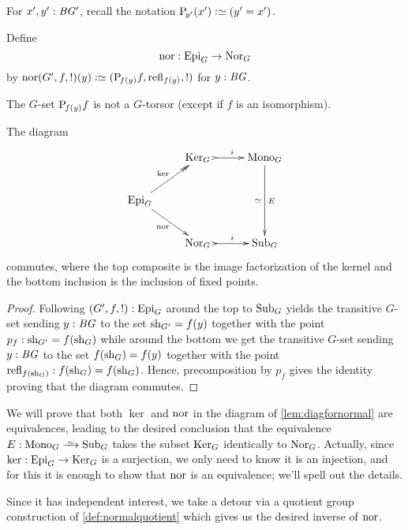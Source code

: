 For $x',y':\mathit{B}\mathit{G}'$, recall the notation $\pathsp{y'}(x')\defequi(y'=x')$.
\begin{definition}
  \label{def:ker2}
  Define $$\nor:\typeepi_G\to\typenormal_G$$
  by $\nor(G',f,!)(y)\defequi(\pathsp{f(y)}f,\refl{f(y)},!)$ for $y:\mathit{B}\mathit{G}$.
\end{definition}
\begin{remark}
  The $G$-set $\mathrm{P}_{\!f(y)}f$ is not a $G$-torsor (except if $f$ is an isomorphism).
\end{remark}

\begin{lemma}
  \label{lem:diagfornormal}
  The diagram
  $$\xymatrix{
  &\typekernel_G\,\,\ar@{>->}[r]^i&\typemono_G\ar[dd]_{\simeq}^{E}\\
  \typeepi_G\ar@{->>}[ur]^{\ker}\ar[dr]_{\nor}&&\\
  &\typenormal_G\,\,\ar@{>->}[r]^i&\typesubgroup_G}
$$
commutes, where the top composite is the image factorization of the kernel and the bottom inclusion is the inclusion of fixed points.
\end{lemma}
\begin{proof}
  Following $(G',f,!):\mathrm{Epi}_G$ around the top to $\mathrm{Sub}_G$ yields the transitive $G$-set sending $y:\mathit{B}\mathit{G}$ to the set $\mathrm{sh}_{G'}=f(y)$ together with the point $p_f:\mathrm{sh}_{G'}=f(\mathrm{sh}_G)$ while around the bottom we get the transitive $G$-set sending $y:\mathit{B}\mathit{G}$ to the set $f(\mathrm{sh}_G)=f(y)$ together with the point $\mathrm{refl}_{f(\mathrm{sh}_G)}:f(\mathrm{sh}_G)=f(\mathrm{sh}_G)$.  Hence, precomposition by $p_f$ gives the identity proving that the diagram commutes.
\end{proof}
We will prove that both $\ker$ and $\nor$ in the diagram of \cref{lem:diagfornormal} are equivalences, leading to the desired conclusion that the equivalence $E:\typemono_G\we\typesubgroup_G$ takes the subset ${\mathrm{Ker}}_G$ identically to $\mathrm{Nor}_G$.
Actually, since $\ker:\typeepi_G\to\typekernel_G$ is a surjection, we only need to know it is an injection, and for this
it is enough to show that $\nor$ is an equivalence; we'll spell out the details.

Since it has independent interest, we take a detour via a quotient group construction of \cref{def:normalquotient} which gives us the desired inverse of $\nor$.

